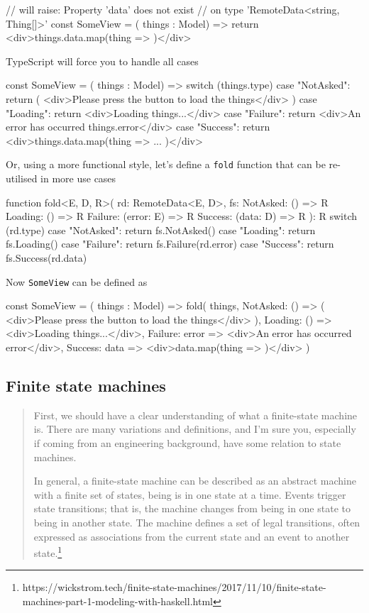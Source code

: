 \documentclass[12pt]{article}
\theoremstyle{definition}
\newenvironment{code}
  {\vspace{0.5cm} \VerbatimEnvironment\begin{typescriptcode}}
  {\end{typescriptcode} \vspace{0.2cm}}
\begin{document}
\begin{code}
// will raise: Property 'data' does not exist
// on type 'RemoteData<string, Thing[]>'
const SomeView = ({ things }: Model) => {
  return <div>{things.data.map(thing => {})}</div>
}
\end{code}

TypeScript will force you to handle all cases

\begin{code}
const SomeView = ({ things }: Model) => {
  switch (things.type) {
    case "NotAsked":
      return (
        <div>Please press the button to load the things</div>
      )
    case "Loading":
      return <div>Loading things...</div>
    case "Failure":
      return <div>An error has occurred {things.error}</div>
    case "Success":
      return <div>{things.data.map(thing => { ... })}</div>
  }
}
\end{code}

Or, using a more functional style, let's define a \texttt{fold} function that can be re-utilised in more use cases

\begin{code}
function fold<E, D, R>(
  rd: RemoteData<E, D>,
  fs: {
    NotAsked: () => R
    Loading: () => R
    Failure: (error: E) => R
    Success: (data: D) => R
  }
): R {
  switch (rd.type) {
    case "NotAsked":
      return fs.NotAsked()
    case "Loading":
      return fs.Loading()
    case "Failure":
      return fs.Failure(rd.error)
    case "Success":
      return fs.Success(rd.data)
  }
}
\end{code}

Now \texttt{SomeView} can be defined as

\begin{code}
const SomeView = ({ things }: Model) =>
  fold(
    things,
    {
      NotAsked: () => (
        <div>Please press the button to load the things</div>
      ),
      Loading: () => <div>Loading things...</div>,
      Failure: error => <div>An error has occurred {error}</div>,
      Success: data => <div>{data.map(thing => {})}</div>
    }
  )
\end{code}

\subsection{Finite state machines}

\begin{quote}
First, we should have a clear understanding of what a finite-state machine is. There are many variations and definitions,
and I’m sure you, especially if coming from an engineering background, have some relation to state machines.

In general, a finite-state machine can be described as an abstract machine with a finite set of states,
being is in one state at a time. Events trigger state transitions; that is, the machine changes from being in one
state to being in another state. The machine defines a set of legal transitions, often expressed as associations
from the current state and an event to another state.\footnote{https://wickstrom.tech/finite-state-machines/2017/11/10/finite-state-machines-part-1-modeling-with-haskell.html}
\end{quote}
\end{document}
